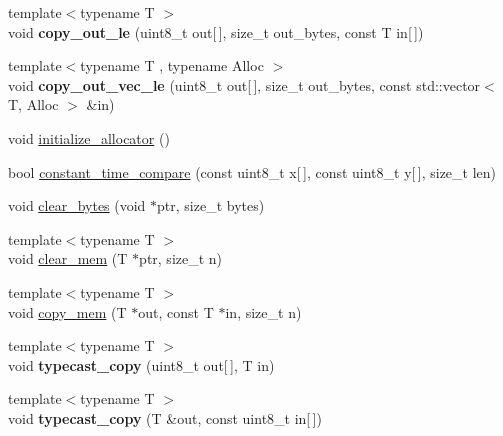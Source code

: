 \begin{DoxyCompactItemize}
\item 
\mbox{\label{namespace_botan_a0c13ee419fb7aec9be106be04a7d58b0}} 
{\footnotesize template$<$typename T $>$ }\\void {\bfseries copy\+\_\+out\+\_\+le} (uint8\+\_\+t out\mbox{[}$\,$\mbox{]}, size\+\_\+t out\+\_\+bytes, const T in\mbox{[}$\,$\mbox{]})
\item 
\mbox{\label{namespace_botan_a50163d1f1821b426712ed51ea5f55f89}} 
{\footnotesize template$<$typename T , typename Alloc $>$ }\\void {\bfseries copy\+\_\+out\+\_\+vec\+\_\+le} (uint8\+\_\+t out\mbox{[}$\,$\mbox{]}, size\+\_\+t out\+\_\+bytes, const std\+::vector$<$ T, Alloc $>$ \&in)
\item 
void \hyperlink{namespace_botan_a5c191055a4f5a2dba6bfde0e8056eaab}{initialize\+\_\+allocator} ()
\item 
bool \hyperlink{namespace_botan_a8715d6667de5be024045dd6f4f53094e}{constant\+\_\+time\+\_\+compare} (const uint8\+\_\+t x\mbox{[}$\,$\mbox{]}, const uint8\+\_\+t y\mbox{[}$\,$\mbox{]}, size\+\_\+t len)
\item 
void \hyperlink{namespace_botan_a7ce0c066e1e47c17c9ed2d4c5ae35b34}{clear\+\_\+bytes} (void $\ast$ptr, size\+\_\+t bytes)
\item 
{\footnotesize template$<$typename T $>$ }\\void \hyperlink{namespace_botan_aeb6cf2051aa89f9d76cf4d55c126b314}{clear\+\_\+mem} (T $\ast$ptr, size\+\_\+t n)
\item 
{\footnotesize template$<$typename T $>$ }\\void \hyperlink{namespace_botan_a81dcdaaa3ce9b5c1025d32be2594b2de}{copy\+\_\+mem} (T $\ast$out, const T $\ast$in, size\+\_\+t n)
\item 
\mbox{\label{namespace_botan_aa966cb77e997f72b991d14c909bd10dc}} 
{\footnotesize template$<$typename T $>$ }\\void {\bfseries typecast\+\_\+copy} (uint8\+\_\+t out\mbox{[}$\,$\mbox{]}, T in)
\item 
\mbox{\label{namespace_botan_a366aab3f4f74c790fc0abf1abfa361d2}} 
{\footnotesize template$<$typename T $>$ }\\void {\bfseries typecast\+\_\+copy} (T \&out, const uint8\+\_\+t in\mbox{[}$\,$\mbox{]})
\item 

\end{DoxyCompactItemize}

